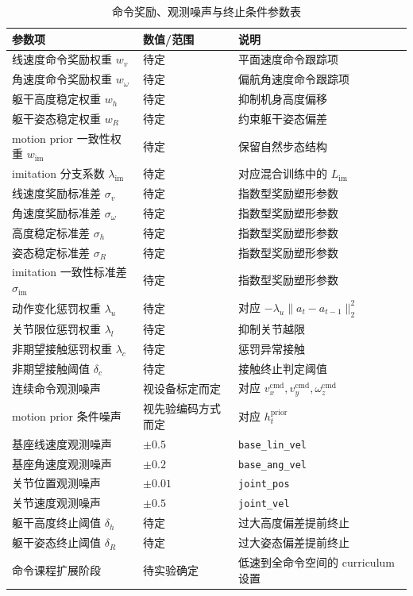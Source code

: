 \begin{table}[htbp]
  \centering
  \caption{命令奖励、观测噪声与终止条件参数表}
  \label{tab:rl-reward-noise-termination}
  \begin{tabular}{p{} p{} p{}}
    \toprule
    参数项 & 数值/范围 & 说明 \\
    \midrule
    线速度命令奖励权重 $w_v$ & 待定 & 平面速度命令跟踪项 \\
    角速度命令奖励权重 $w_{\omega}$ & 待定 & 偏航角速度命令跟踪项 \\
    躯干高度稳定权重 $w_h$ & 待定 & 抑制机身高度偏移 \\
    躯干姿态稳定权重 $w_R$ & 待定 & 约束躯干姿态偏差 \\
    motion prior 一致性权重 $w_{\mathrm{im}}$ & 待定 & 保留自然步态结构 \\
    imitation 分支系数 $\lambda_{\mathrm{im}}$ & 待定 & 对应混合训练中的 $L_{\mathrm{im}}$ \\
    线速度奖励标准差 $\sigma_v$ & 待定 & 指数型奖励塑形参数 \\
    角速度奖励标准差 $\sigma_{\omega}$ & 待定 & 指数型奖励塑形参数 \\
    高度稳定标准差 $\sigma_h$ & 待定 & 指数型奖励塑形参数 \\
    姿态稳定标准差 $\sigma_R$ & 待定 & 指数型奖励塑形参数 \\
    imitation 一致性标准差 $\sigma_{\mathrm{im}}$ & 待定 & 指数型奖励塑形参数 \\
    动作变化惩罚权重 $\lambda_u$ & 待定 & 对应 $-\lambda_u\lVert a_t-a_{t-1}\rVert_2^2$ \\
    关节限位惩罚权重 $\lambda_l$ & 待定 & 抑制关节越限 \\
    非期望接触惩罚权重 $\lambda_c$ & 待定 & 惩罚异常接触 \\
    非期望接触阈值 $\delta_c$ & 待定 & 接触终止判定阈值 \\
    连续命令观测噪声 & 视设备标定而定 & 对应 $v_x^{\mathrm{cmd}}, v_y^{\mathrm{cmd}}, \omega_z^{\mathrm{cmd}}$ \\
    motion prior 条件噪声 & 视先验编码方式而定 & 对应 $h_t^{\mathrm{prior}}$ \\
    基座线速度观测噪声 & $\pm 0.5$ & \texttt{base\_lin\_vel} \\
    基座角速度观测噪声 & $\pm 0.2$ & \texttt{base\_ang\_vel} \\
    关节位置观测噪声 & $\pm 0.01$ & \texttt{joint\_pos} \\
    关节速度观测噪声 & $\pm 0.5$ & \texttt{joint\_vel} \\
    躯干高度终止阈值 $\delta_h$ & 待定 & 过大高度偏差提前终止 \\
    躯干姿态终止阈值 $\delta_R$ & 待定 & 过大姿态偏差提前终止 \\
    命令课程扩展阶段 & 待实验确定 & 低速到全命令空间的 curriculum 设置 \\
    \bottomrule
  \end{tabular}
\end{table}
